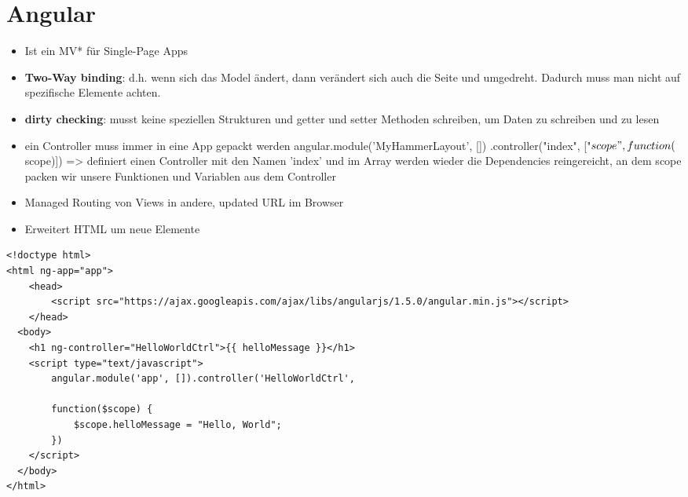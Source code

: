 \def\home{../../styles}

















\usepackage[strings]{underscore} %





\section{Angular}
\begin{itemize}
  \item Ist ein MV* für Single-Page Apps
  \item \textbf{Two-Way binding}: d.h. wenn sich das Model ändert, dann verändert sich auch die Seite und umgedreht. Dadurch muss man nicht auf spezifische Elemente achten.
  \item \textbf{dirty checking}: musst keine speziellen Strukturen und getter und setter Methoden schreiben, um Daten zu schreiben und zu lesen
  \item ein Controller muss immer in eine App gepackt werden
  angular.module('MyHammerLayout', [])
    .controller("index", ["$scope", function($scope)]) => definiert einen Controller mit den Namen 'index' und im Array
    werden wieder die Dependencies reingereicht, an dem scope packen wir unsere Funktionen und Variablen aus dem
    Controller
  \item Managed Routing von Views in andere, updated URL im Browser
  \item Erweitert HTML um neue Elemente
\end{itemize}

\begin{verbatim}
<!doctype html>
<html ng-app="app">
    <head>
        <script src="https://ajax.googleapis.com/ajax/libs/angularjs/1.5.0/angular.min.js"></script>
    </head>
  <body>
    <h1 ng-controller="HelloWorldCtrl">{{ helloMessage }}</h1>
    <script type="text/javascript">
        angular.module('app', []).controller('HelloWorldCtrl',

        function($scope) {
            $scope.helloMessage = "Hello, World";
        })
    </script>
  </body>
</html>
\end{verbatim}

